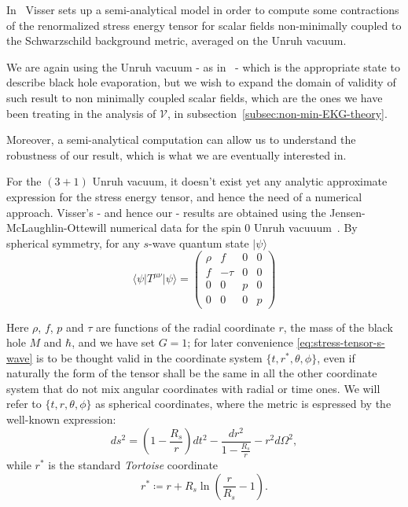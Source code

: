 In~\cite[]{visser1997gravitational} Visser sets up a semi-analytical model in order to compute some contractions of the renormalized stress energy tensor for scalar fields non-minimally coupled to the Schwarzschild background metric, averaged on the Unruh vacuum.

We are again using the Unruh vacuum - as in~\cite[]{levi2016versatile} - which is the appropriate state to describe black hole evaporation, but we wish to expand the domain of validity of such result to non minimally coupled scalar fields, which are the ones we have been treating in the analysis of \(\mathcal{V}\), in subsection~\ref{subsec:non-min-EKG-theory}.

Moreover, a semi-analytical computation can allow us to understand the robustness of our result, which is what we are eventually interested in.

For the \((3 + 1)\) Unruh vacuum, it doesn't exist yet any analytic approximate expression for the stress energy tensor, and hence the need of a numerical approach. Visser's - and hence our - results are obtained using the Jensen-McLaughlin-Ottewill numerical data for the spin \(0\) Unruh vacuuum~\cite[]{jensen1991renormalized}. By spherical symmetry, for any \(s\)-wave quantum state \(\vert \psi\rangle\) 
\begin{equation}
    \label{eq:stress-tensor-s-wave}
    \langle\psi\vert T^{\mu\nu}\vert\psi\rangle = \begin{pmatrix}
        \rho & f & 0 & 0 \\
        f & -\tau & 0 & 0 \\
        0 & 0 & p & 0 \\
        0 & 0 & 0 & p
    \end{pmatrix}
\end{equation}

Here \(\rho\), \(f\), \(p\) and  \(\tau\) are functions of the radial coordinate \(r\), the mass of the black hole \(M\) and \(\hbar\), and we have set \(G = 1\); for later convenience \eqref{eq:stress-tensor-s-wave} is to be thought valid in the coordinate system \(\{t, r^*, \theta, \phi\}\), even if naturally the form of the tensor shall be the same in all the other coordinate system that do not mix angular coordinates with radial or time ones. We will refer to \(\{t, r, \theta, \phi\}\) as spherical coordinates, where the metric is espressed by the well-known expression:
\[
ds^2 =  \left(1 - \frac{R_s}{r}\right)dt^2  - \frac{dr^2}{1 - \frac{R_s}{r}} - r^2d\Omega^2,
\]
while \(r^*\) is the standard \emph{Tortoise} coordinate
\[
r^* \coloneqq r + R_s\ln\left(\frac{r}{R_s} - 1\right).    
\]


